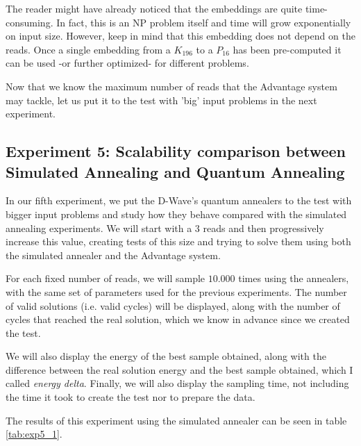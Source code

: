 The reader might have already noticed that the embeddings are quite time-consuming. In fact, this is an NP problem itself and time will grow exponentially on input size. However, keep in mind that this embedding does not depend on the reads. Once a single embedding from a $K_{196}$ to a $P_{16}$ has been pre-computed it can be used -or further optimized- for different problems.

Now that we know the maximum number of reads that the Advantage system may tackle, let us put it to the test with 'big' input problems in the next experiment.


\subsection{Experiment 5: Scalability comparison between Simulated Annealing and Quantum Annealing}


In our fifth experiment, we put the D-Wave's quantum annealers to the test with bigger input problems and study how they behave compared with the simulated annealing experiments. We will start with a $3$ reads and then progressively increase this value, creating tests of this size and trying to solve them using both the simulated annealer and the Advantage system.

For each fixed number of reads, we will sample $10.000$ times using the annealers, with the same set of parameters used for the previous experiments. The number of valid solutions (i.e. valid cycles) will be displayed, along with the number of cycles that reached the real solution, which we know in advance since we created the test.

We will also display the energy of the best sample obtained, along with the difference between the real solution energy and the best sample obtained, which I called \emph{energy delta}. Finally, we will also display the sampling time, not including the time it took to create the test nor to prepare the data.

The results of this experiment using the simulated annealer can be seen in table \ref{tab:exp5_1}. 

